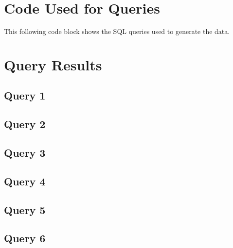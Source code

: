\documentclass[letter,12pt]{texMemo}
\begin{document}
\maketitle

\section*{Code Used for Queries}
This following code block shows the SQL queries used to generate the data.


\section*{Query Results}
\subsection*{Query 1}


\subsection*{Query 2}


\subsection*{Query 3}


\subsection*{Query 4}


\subsection*{Query 5}


\subsection*{Query 6}



%
%
\end{document}
